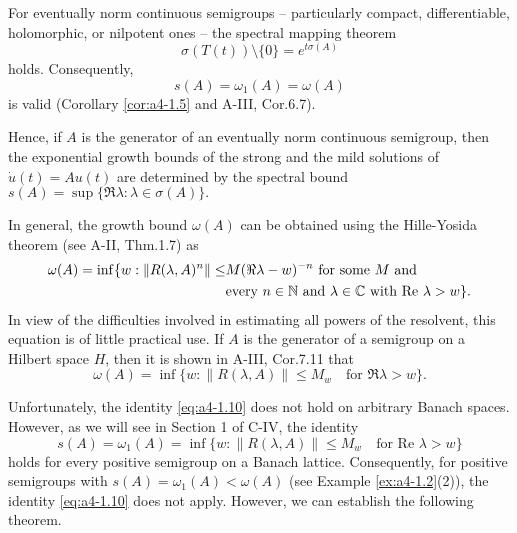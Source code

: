 \begin{remark} For eventually norm continuous semigroups -- particularly compact, differentiable, holomorphic, or nilpotent ones -- the spectral mapping theorem 
\begin{equation}
\sigma(T(t)) \setminus \{0\} = e^{t \sigma(A)}
\end{equation}
holds. 
Consequently,
\begin{equation}\label{eq:a4-1.8}
s(A) = \omega_1(A) = \omega(A)
\end{equation}
    is valid (Corollary \ref{cor:a4-1.5} and A-III, Cor.6.7).

\noindent Hence, if $A$ is the generator of an eventually norm continuous semigroup, then the exponential growth bounds of the strong and the mild solutions of \quad $\dot{u}(t) = A u(t)$ \quad are determined by the spectral bound
\(s(A) = \sup\{\Re \lambda : \lambda \in \sigma(A)\}.\)
\end{remark}
\begin{remark} In general, the growth bound $\omega(A)$ can be obtained using the Hille-Yosida theorem (see A-II, Thm.1.7) as
\begin{align}\label{eq:a4-1.9}
\omega(A) = \inf \{ w : \|R(\lambda, A)^n\| \leq &M ( \Re \lambda - w)^{-n} \text{ for some } M \text{ and}\\
&\text{every } n \in \mathbb{N} \text{ and } \lambda \in \mathbb{C} \text{ with } \text{Re } \lambda > w\}.\notag
\end{align}
\noindent In view of the difficulties involved in estimating all powers of the resolvent, this equation is of little practical use. 
If $A$ is the generator of a semigroup on a Hilbert space $H$, then it is shown in A-III, Cor.7.11 that
\begin{equation}\label{eq:a4-1.10}
 \omega(A) = \inf \{ w : \| R(\lambda, A) \| \leq M_w \quad \text{for } \Re \lambda > w \}.
\end{equation}
\end{remark}
\noindent Unfortunately, the identity \eqref{eq:a4-1.10} does not hold on arbitrary Banach spaces. 
However, as we will see in Section 1 of C-IV, the identity 
\begin{equation}\label{eq:a4-1.11}
 s(A)=\omega_1(A) = \inf \{ w : \| R(\lambda, A) \| \leq M_w \quad \text{for } \text{Re } \lambda > w \}
\end{equation}
\noindent holds for every positive semigroup on a Banach lattice. 
Consequently, for positive semigroups with $s(A) = \omega_1(A) < \omega(A)$ (see Example \ref{ex:a4-1.2}(2)), the identity \eqref{eq:a4-1.10} does not apply. 
However, we can establish the following theorem.

